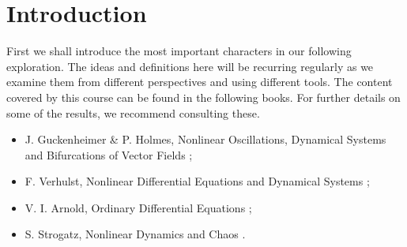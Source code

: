 \chapter{Introduction}
First we shall introduce the most important characters in our following exploration. The ideas and definitions here will be recurring regularly as we examine them from different perspectives and using different tools. The content covered by this course can be found in the following books. For further details on some of the results, we recommend consulting these.
\begin{itemize}
	\item J. Guckenheimer \& P. Holmes, Nonlinear Oscillations, Dynamical Systems and Bifurcations of Vector Fields \cite{GuckenheimerHolmes};
	\item F. Verhulst, Nonlinear Differential Equations and Dynamical Systems \cite{Verhulst};
	\item V. I. Arnold, Ordinary Differential Equations \cite{Arnold};
	\item S. Strogatz, Nonlinear Dynamics and Chaos \cite{Strogatz}.
\end{itemize}


